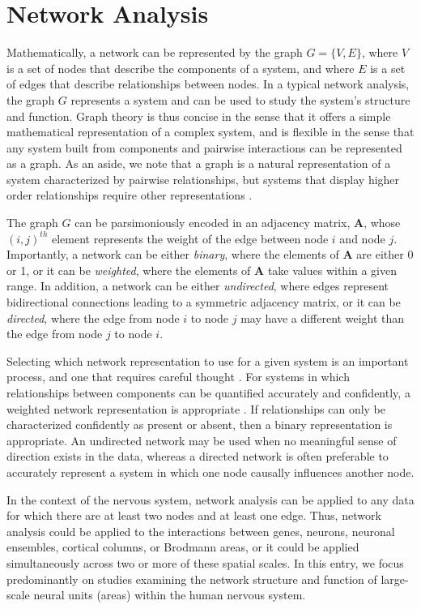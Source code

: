 \documentclass[12pt]{article}
\begin{document}
\section*{Network Analysis}

Mathematically, a network can be represented by the graph $G = \{V,E\}$, where $V$ is a set of nodes that describe the components of a system, and where $E$ is a set of edges that describe relationships between nodes. In a typical network analysis, the graph $G$ represents a system and can be used to study the system's structure and function. Graph theory is thus concise in the sense that it offers a simple mathematical representation of a complex system, and is flexible in the sense that any system built from components and pairwise interactions can be represented as a graph. As an aside, we note that a graph is a natural representation of a system characterized by pairwise relationships, but systems that display higher order relationships require other representations \cite{giusti2016two}.

The graph $G$ can be parsimoniously encoded in an adjacency matrix, $\mathbf{A}$, whose $(i,j)^{th}$ element represents the weight of the edge between node $i$ and node $j$. Importantly, a network can be either \emph{binary}, where the elements of $\mathbf{A}$ are either 0 or 1, or it can be \emph{weighted}, where the elements of $\mathbf{A}$ take values within a given range. In addition, a network can be either \emph{undirected}, where edges represent bidirectional connections leading to a symmetric adjacency matrix, or it can be \emph{directed}, where the edge from node $i$ to node $j$ may have a different weight than the edge from node $j$ to node $i$. 

Selecting which network representation to use for a given system is an important process, and one that requires careful thought \cite{rubinov2010complex}. For systems in which relationships between components can be quantified accurately and confidently, a weighted network representation is appropriate \cite{bassett2016small}. If relationships can only be characterized confidently as present or absent, then a binary representation is appropriate. An undirected network may be used when no meaningful sense of direction exists in the data, whereas a directed network is often preferable to accurately represent a system in which one node causally influences another node. 

In the context of the nervous system, network analysis can be applied to any data for which there are at least two nodes and at least one edge. Thus, network analysis could be applied to the interactions between genes, neurons, neuronal ensembles, cortical columns, or Brodmann areas, or it could be applied simultaneously across two or more of these spatial scales. In this entry, we focus predominantly on studies examining the network structure and function of large-scale neural units (areas) within the human nervous system. 
\end{document}

